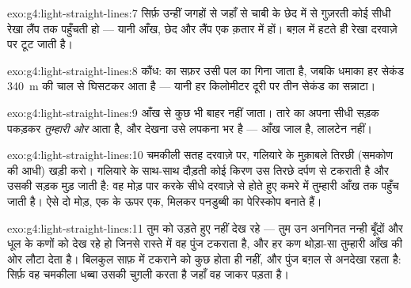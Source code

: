 \begin{solution}{exo:g4:light-straight-lines:7}
सिर्फ़ उन्हीं जगहों से जहाँ से चाबी के छेद में से गुज़रती कोई सीधी
रेखा लैंप तक पहुँचती हो --- यानी आँख, छेद और लैंप एक क़तार में हों।
बग़ल में हटते ही रेखा दरवाज़े पर टूट जाती है।
\end{solution}

\begin{solution}{exo:g4:light-straight-lines:8}
कौंध:  का सफ़र उसी पल का गिना जाता है, जबकि धमाका हर सेकंड
\qty{340}{m} की चाल से घिसटकर आता है --- यानी हर किलोमीटर दूरी पर
तीन सेकंड का सन्नाटा।
\end{solution}

\begin{solution}{exo:g4:light-straight-lines:9}
आँख से कुछ भी बाहर नहीं जाता। तारे का अपना  सीधी सड़क पकड़कर
\emph{तुम्हारी ओर} आता है, और देखना उसे लपकना भर है --- आँख जाल है,
लालटेन नहीं।
\end{solution}

\begin{solution}{exo:g4:light-straight-lines:10}
चमकीली सतह दरवाज़े पर, गलियारे के मुक़ाबले तिरछी (समकोण की आधी) खड़ी
करो। गलियारे के साथ-साथ दौड़ती कोई किरण उस तिरछे दर्पण से टकराती है
और उसकी सड़क मुड़ जाती है: वह मोड़ पार करके सीधे दरवाज़े से होते हुए
कमरे में तुम्हारी आँख तक पहुँच जाती है। ऐसे दो मोड़, एक के ऊपर एक,
मिलकर पनडुब्बी का पेरिस्कोप बनाते हैं।
\end{solution}

\begin{solution}{exo:g4:light-straight-lines:11}
तुम  को उड़ते हुए नहीं देख रहे --- तुम उन अनगिनत नन्ही बूँदों
और धूल के कणों को देख रहे हो जिनसे रास्ते में वह पुंज टकराता है, और
हर कण थोड़ा-सा  तुम्हारी आँख की ओर लौटा देता है। बिलकुल साफ़
 में टकराने को कुछ होता ही नहीं, और पुंज बग़ल से अनदेखा रहता है:
सिर्फ़ वह चमकीला धब्बा उसकी चुग़ली करता है जहाँ वह जाकर पड़ता है।
\end{solution}
